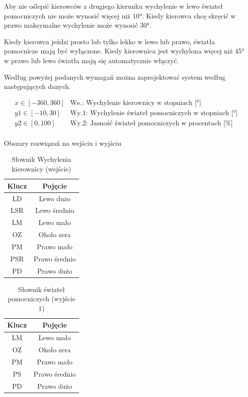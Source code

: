 Aby nie oślepić kierowców z drugiego kierunku wychylenie w lewo świateł pomocniczych nie może wynosić więcej niż 10°. Kiedy kierowca chcę skręcić w prawo maksymalne wychylenie może wynosić 30°.

Kiedy kierowca jeździ prosto lub tylko lekko w lewo lub prawo, światła pomocnicze mają być wyłączone. Kiedy kierownica jest wychylona więcej niż 45° w prawo lub lewo światła mają się automatycznie włączyć.

Według powyżej podanych wymagań można zaprojektować system według następujących danych.

\begin{equation}
\begin{array}{ll}
x \in [-360, 360] & \textrm{We.: Wychylenie kierownicy w stopniach [°]} \\
y1 \in [-10,30] & \textrm{Wy.1: Wychylenie świateł pomocniczych w stopniach [°]} \\
y2 \in [0,100] & \textrm{Wy.2: Jasność świateł pomocniczych w procentach [\%]} \\
\end{array}
\end{equation}
\begin{center}Obszary rozwiązań na wejściu i wyjściu\end{center}

\begin{table}[h]
\centering
\begin{tabular}[t]{c|c}
Klucz & Pojęcie \\
\hline
LD & Lewo dużo \\
LSR & Lewo średnio \\
LM & Lewo mało \\
OZ & Około zera \\
PM & Prawo mało \\
PSR & Prawo średnio \\
PD & Prawo dużo \\
\end{tabular}
\caption{Słownik Wychylenia kierownicy (wejście)}
\end{table}

\begin{table}[h]
\centering
\begin{tabular}[t]{c|c}
Klucz & Pojęcie \\
\hline
LM & Lewo mało \\
OZ & Około zera \\
PM & Prawo mało \\
PS & Prawo średnio \\
PD & Prawo dużo \\
\end{tabular}
\caption{Słownik świateł pomocniczych (wyjście 1)}
\end{table}

